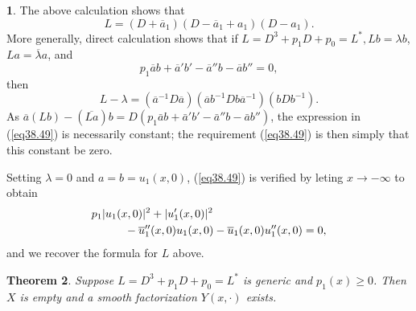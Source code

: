 \documentclass{surv-l}
\theoremstyle{plain}
\newtheorem{theorem}{Theorem}[section]
\theoremstyle{definition}
\newtheorem{remark}[theorem]{\sc{Remark}}
\numberwithin{equation}{chapter}
\begin{document}
\begin{remark}\label{rem38.48} The above calculation shows that
\begin{equation*}
L=(D+\overline{a}_{1})(D-\overline{a}_{1}+a_{1})(D-a_{1}).
\end{equation*}
More generally, direct calculation shows that if $L=D^{3}+p_{1}D+p_{0}=L^{*},Lb=\lambda b$,
$La=\overline{\lambda}a$, and
\setcounter{equation}{48}
\begin{equation}\label{eq38.49}
p_{1}\overline{a}b+\overline{a}'b'-\overline{a}''b-\overline{a}b''=0,
\end{equation}
then
\begin{equation*}
L-\lambda=(\overline{a}^{-1}D\overline{a})(\overline{a}b^{-1}Db\overline{a}^{-1})(bDb^{-1}).
\end{equation*}
As $\overline{a}(Lb)-(\overline{La})b=D(p_{1}\bar{a}b+\bar{a}'b'-\bar{a}''b-\bar{a}b'')$, the expression in (\ref{eq38.49}) is necessarily constant; the requirement (\ref{eq38.49}) is then simply that this constant be zero.

Setting $\lambda=0$ and $a=b=u_{1}(x,0)$, (\ref{eq38.49}) is verified by leting $ x\rightarrow-\infty$ to obtain
\begin{align}\label{eq38.50}
p_{1}&|u_{1}(x, 0)|^{2}+|u_{1}'(x,0)|^{2}\\
&\qquad -\overline{u}_{1}''(x, 0)u_1(x,0)-\overline{u}_{1}(x, 0)u_{1}''(x, 0)=0,\notag
\end{align}
and we recover the formula for $L$ above.
\end{remark}
\setcounter{theorem}{50}
\begin{theorem}\label{thm38.51} Suppose $L=D^{3}+p_{1}D+p_{0}=L^{*}$ is generic and $ p_{1}(x)\geq 0$. Then $X$ is empty and a smooth factorization $Y(x,\cdot)$ exists.
\end{theorem}
\end{document}
